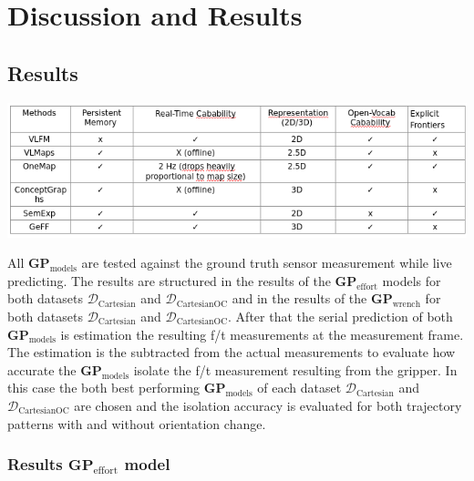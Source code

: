 \chapter{Discussion and Results}

\section{Results}

    \includegraphics[width=\textwidth]{Images/1_introduction/temp_sota_comparison_common_properties.png}

    All \(\boldsymbol{GP}_{\text{models}}\) are tested against the ground truth sensor measurement while live predicting. The results are structured in the results of the \(\boldsymbol{GP}_{\text{effort}}\) models for both datasets \(\mathcal{D}_{\text{Cartesian}}\) and \(\mathcal{D}_{\text{CartesianOC}}\) and in the results of the \(\boldsymbol{GP}_{\text{wrench}}\) for both datasets \(\mathcal{D}_{\text{Cartesian}}\) and \(\mathcal{D}_{\text{CartesianOC}}\). 
    After that the serial prediction of both \(\boldsymbol{GP}_{\text{models}}\) is estimation the resulting f/t measurements at the measurement frame. The estimation is the subtracted from the actual measurements to evaluate how accurate the \(\boldsymbol{GP}_{\text{models}}\) isolate the f/t measurement resulting from the gripper. In this case the both best performing \(\boldsymbol{GP}_{\text{models}}\) of each dataset \(\mathcal{D}_{\text{Cartesian}}\) and \(\mathcal{D}_{\text{CartesianOC}}\) are chosen and the isolation accuracy is evaluated for both trajectory patterns with and without orientation change. 

    \subsection{Results \(\boldsymbol{GP}_{\text{effort}}\) model}
    \label{subsec:gp_effort_results}

